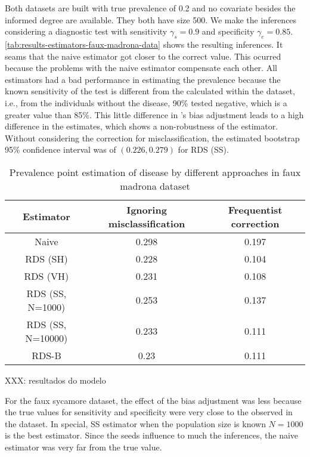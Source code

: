 Both datasets are built with true prevalence of 0.2 and no covariate besides
the informed degree are available. They both have size 500. We make the
inferences considering a diagnostic test with sensitivity $\gamma_s = 0.9$ 
and specificity $\gamma_e = 0.85$.
\autoref{tab:results-estimators-faux-madrona-data} shows the resulting
inferences. It seams that the naive estimator got closer to the correct value.
This ocurred because the problems with the naive estimator compensate each
other. All estimators had a bad performance in estimating the prevalence
because the known sensitivity of the test is different from the calculated
within the dataset, i.e., from the individuals without the disease, 90\%
tested negative, which is a greater value than 85\%. This little difference in
\textcite{rogan1978estimating}'s bias adjustment leads to a high difference in
the estimates, which shows a non-robustness of the estimator. Without considering the
correction for misclassification, the estimated bootstrap 95\% confidence interval was
of $(0.226, 0.279)$ for RDS (SS). 

\begin{table}[htbp]
    \centering
    \caption{\label{tab:results-estimators-faux-madrona-data}Prevalence point estimation of
    disease by different approaches in faux madrona dataset}
    \begin{tabular}{ccc}
    \hline
    Estimator & Ignoring misclassification & Frequentist correction \\ \hline
    Naive & 0.298 & 0.197 \\
    RDS (SH) & 0.228 & 0.104 \\
    RDS (VH) & 0.231 & 0.108 \\
    RDS (SS, N=1000) & 0.253 & 0.137 \\
    RDS (SS, N=10000) & 0.233 & 0.111 \\
    RDS-B & 0.23 & 0.111 \\ \hline
    \end{tabular}
\end{table}

XXX: resultados do modelo

For the faux sycamore dataset, the effect of the bias adjustment was less
because the true values for sensitivity and specificity were very close to the
observed in the dataset. In special, SS estimator when the population size is
known $N = 1000$ is the best estimator. Since the seeds influence to much the
inferences, the naive estimator was very far from the true value. 

